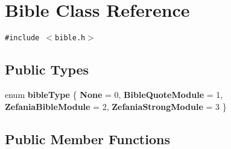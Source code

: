 \hypertarget{classBible}{
\section{Bible Class Reference}
\label{classBible}
}
{\tt \#include $<$bible.h$>$}

\subsection*{Public Types}
\begin{CompactItemize}
\item 
enum \textbf{bibleType} \{ \textbf{None} =  0, 
\textbf{BibleQuoteModule} =  1, 
\textbf{ZefaniaBibleModule} =  2, 
\textbf{ZefaniaStrongModule} =  3
 \}
\end{CompactItemize}
\subsection*{Public Member Functions}
